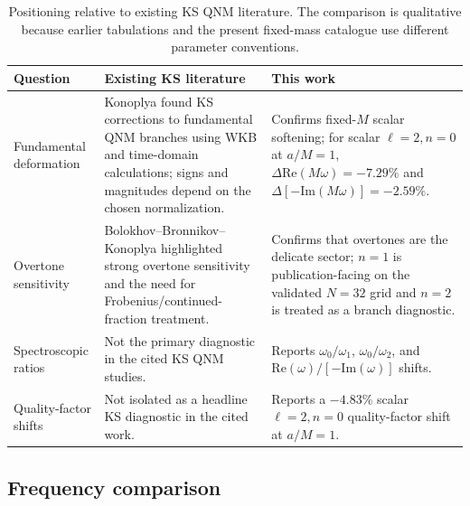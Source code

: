 \documentclass[10pt,letterpaper,twocolumn]{article}
\begin{document}
\begin{table}[t]
\centering
\footnotesize
\renewcommand{\arraystretch}{1.16}
\begin{tabularx}{\textwidth}{>{\raggedright\arraybackslash}p{}>{\raggedright\arraybackslash}p{}>{\raggedright\arraybackslash}X}
\toprule
Question & Existing KS literature & This work \\
\midrule
Fundamental deformation & Konoplya found KS corrections to fundamental QNM branches using WKB and time-domain calculations; signs and magnitudes depend on the chosen normalization. & Confirms fixed-\(M\) scalar softening; for scalar \(\ell=2,n=0\) at \(a/M=1\), \(\Delta\mathrm{Re}(M\omega)=-7.29\%\) and \(\Delta[-\mathrm{Im}(M\omega)]=-2.59\%\). \\
Overtone sensitivity & Bolokhov--Bronnikov--Konoplya highlighted strong overtone sensitivity and the need for Frobenius/continued-fraction treatment. & Confirms that overtones are the delicate sector; \(n=1\) is publication-facing on the validated \(N=32\) grid and \(n=2\) is treated as a branch diagnostic. \\
Spectroscopic ratios & Not the primary diagnostic in the cited KS QNM studies. & Reports \(\omega_0/\omega_1\), \(\omega_0/\omega_2\), and \(\mathrm{Re}(\omega)/[-\mathrm{Im}(\omega)]\) shifts. \\
Quality-factor shifts & Not isolated as a headline KS diagnostic in the cited work. & Reports a \(-4.83\%\) scalar \(\ell=2,n=0\) quality-factor shift at \(a/M=1\). \\
\bottomrule
\end{tabularx}
\caption{Positioning relative to existing KS QNM literature. The comparison is qualitative because earlier tabulations and the present fixed-mass catalogue use different parameter conventions.}
\label{tab:literaturecomparison}
\end{table}

\subsection{Frequency comparison}
\end{document}
